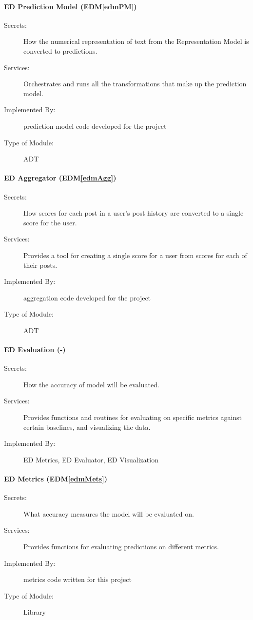 \documentclass[12pt, titlepage]{article}
\newcommand{\edmref}[1]{EDM\ref{#1}}
\begin{document}
\paragraph{ED Prediction Model (\edmref{edmPM})}
\begin{description}
\item[Secrets:] How the numerical representation of text from the Representation Model is converted to predictions.
\item[Services:] Orchestrates and runs all the transformations that make up the prediction model.
\item[Implemented By:] prediction model code developed for the project
\item[Type of Module:] ADT
\end{description}

\paragraph{ED Aggregator (\edmref{edmAgg})}
\begin{description}
\item[Secrets:] How scores for each post in a user's post history are converted to a single score for the user.
\item[Services:] Provides a tool for creating a single score for a user from scores for each of their posts.
\item[Implemented By:] aggregation code developed for the project
\item[Type of Module:] ADT
\end{description}

\paragraph{ED Evaluation (-)}
\begin{description}
\item[Secrets:] How the accuracy of model will be evaluated.
\item[Services:] Provides functions and routines for evaluating on specific metrics against certain baselines, and visualizing the data.
\item[Implemented By:] ED Metrics, ED Evaluator, ED Visualization
\end{description}

\paragraph{ED Metrics (\edmref{edmMets})}
\begin{description}
\item[Secrets:] What accuracy measures the model will be evaluated on.
\item[Services:] Provides functions for evaluating predictions on different metrics.
\item[Implemented By:] metrics code written for this project
\item[Type of Module:] Library
\end{description}
\end{document}
